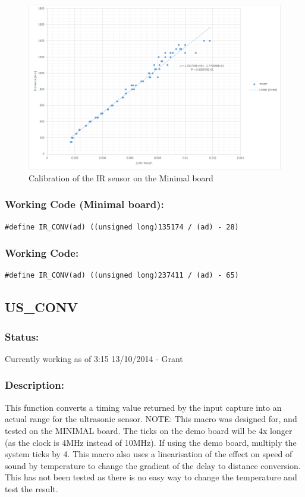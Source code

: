 \documentclass[]{report}
\begin{document}
\begin{figure}
\centering
\includegraphics[width=0.7\linewidth]{"IR Minimal Calibration"}
\caption{Calibration of the IR sensor on the Minimal board}
\label{fig:IRMinimalCalibration}
\end{figure}


\subsubsection{Working Code (Minimal board):}
\begin{lstlisting}
#define IR_CONV(ad) ((unsigned long)135174 / (ad) - 28)
\end{lstlisting}


\subsubsection{Working Code:}
\begin{lstlisting}
#define IR_CONV(ad) ((unsigned long)237411 / (ad) - 65)
\end{lstlisting}

\subsection{US\_CONV}
\subsubsection{Status:}
Currently working as of 3:15 13/10/2014 - Grant

\subsubsection{Description:}
This function converts a timing value returned by the input capture into an actual range for the ultrasonic sensor. \newline
NOTE: This macro was designed for, and tested on the MINIMAL board. The ticks on the demo board will be 4x longer (as the clock is 4MHz instead of 10MHz). If using the demo board, multiply the system ticks by 4. \newline
This macro also uses a linearisation of the effect on speed of sound by temperature to change the gradient of the delay to distance conversion. This has not been tested as there is no easy way to change the temperature and test the result. 
\end{document}
